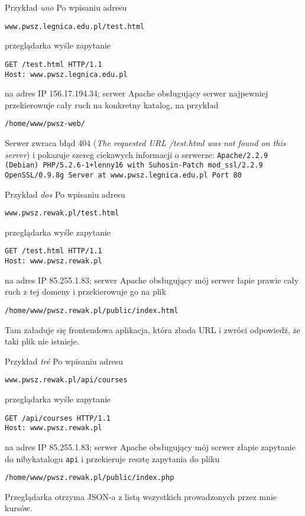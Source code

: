 \begin{frame}[fragile]{Przykład \emph{uno}}
	Po wpisaniu adresu
	\begin{lstlisting}
www.pwsz.legnica.edu.pl/test.html
	\end{lstlisting}
	
	przeglądarka wyśle zapytanie
	\begin{lstlisting}
GET /test.html HTTP/1.1
Host: www.pwsz.legnica.edu.pl
	\end{lstlisting}
	
	na adres IP 156.17.194.34; serwer Apache obsługujący serwer najpewniej przekierowuje cały ruch na konkretny katalog, na przykład
	\begin{lstlisting}
/home/www/pwsz-web/
	\end{lstlisting}
	
	Serwer zwraca błąd 404 (\emph{The requested URL /test.html was not found on this server}) i pokazuje szereg ciekawych informacji o serwerze: \texttt{Apache/2.2.9 (Debian) PHP/5.2.6-1+lenny16 with Suhosin-Patch mod\_ssl/2.2.9 OpenSSL/0.9.8g Server at www.pwsz.legnica.edu.pl Port 80}
\end{frame}

\begin{frame}[fragile]{Przykład \emph{dos}}
	Po wpisaniu adresu
	\begin{lstlisting}
www.pwsz.rewak.pl/test.html
	\end{lstlisting}
	
	przeglądarka wyśle zapytanie
	\begin{lstlisting}
GET /test.html HTTP/1.1
Host: www.pwsz.rewak.pl
	\end{lstlisting}
	
	na adres IP 85.255.1.83; serwer Apache obsługujący mój serwer łapie prawie cały ruch z tej domeny i przekierowuje go na plik
	\begin{lstlisting}
/home/www/pwsz.rewak.pl/public/index.html
	\end{lstlisting}
	
	Tam załaduje się frontendowa aplikacja, która zbada URL i zwróci odpowiedź, że taki plik nie istnieje.
\end{frame}

\begin{frame}[fragile]{Przykład \emph{tré}}
	Po wpisaniu adresu
	\begin{lstlisting}
www.pwsz.rewak.pl/api/courses
	\end{lstlisting}
	
	przeglądarka wyśle zapytanie
	\begin{lstlisting}
GET /api/courses HTTP/1.1
Host: www.pwsz.rewak.pl
	\end{lstlisting}
	
	na adres IP 85.255.1.83; serwer Apache obsługujący mój serwer złapie zapytanie do nibykatalogu \texttt{api} i przekieruje resztę zapytania do pliku
	\begin{lstlisting}
/home/www/pwsz.rewak.pl/public/index.php
	\end{lstlisting}
	
	Przeglądarka otrzyma JSON-a z listą wszystkich prowadzonych przez mnie kursów.
\end{frame}

